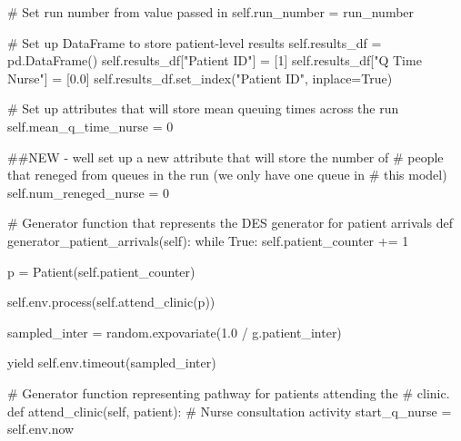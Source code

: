 \documentclass[
  letterpaper,
  DIV=11,
  numbers=noendperiod]{scrreprt}
\newenvironment{Shaded}{}{}
\newcommand{\CommentTok}[1]{\textcolor[rgb]{0.42,0.45,0.49}{#1}}
\newcommand{\ControlFlowTok}[1]{\textcolor[rgb]{0.84,0.23,0.29}{#1}}
\newcommand{\DecValTok}[1]{\textcolor[rgb]{0.00,0.36,0.77}{#1}}
\newcommand{\FloatTok}[1]{\textcolor[rgb]{0.00,0.36,0.77}{#1}}
\newcommand{\KeywordTok}[1]{\textcolor[rgb]{0.84,0.23,0.29}{#1}}
\newcommand{\NormalTok}[1]{\textcolor[rgb]{0.14,0.16,0.18}{#1}}
\newcommand{\OperatorTok}[1]{\textcolor[rgb]{0.14,0.16,0.18}{#1}}
\newcommand{\StringTok}[1]{\textcolor[rgb]{0.01,0.18,0.38}{#1}}
\newcommand{\VariableTok}[1]{\textcolor[rgb]{0.89,0.38,0.04}{#1}}
\begin{document}
\begin{tcolorbox}
\begin{Shaded}
\begin{Highlighting}[]
        \CommentTok{\# Set run number from value passed in}
        \VariableTok{self}\NormalTok{.run\_number }\OperatorTok{=}\NormalTok{ run\_number}

        \CommentTok{\# Set up DataFrame to store patient{-}level results}
        \VariableTok{self}\NormalTok{.results\_df }\OperatorTok{=}\NormalTok{ pd.DataFrame()}
        \VariableTok{self}\NormalTok{.results\_df[}\StringTok{"Patient ID"}\NormalTok{] }\OperatorTok{=}\NormalTok{ [}\DecValTok{1}\NormalTok{]}
        \VariableTok{self}\NormalTok{.results\_df[}\StringTok{"Q Time Nurse"}\NormalTok{] }\OperatorTok{=}\NormalTok{ [}\FloatTok{0.0}\NormalTok{]}
        \VariableTok{self}\NormalTok{.results\_df.set\_index(}\StringTok{"Patient ID"}\NormalTok{, inplace}\OperatorTok{=}\VariableTok{True}\NormalTok{)}

        \CommentTok{\# Set up attributes that will store mean queuing times across the run}
        \VariableTok{self}\NormalTok{.mean\_q\_time\_nurse }\OperatorTok{=} \DecValTok{0}

        \CommentTok{\#\#NEW {-} we\textquotesingle{}ll set up a new attribute that will store the number of}
        \CommentTok{\# people that reneged from queues in the run (we only have one queue in}
        \CommentTok{\# this model)}
        \VariableTok{self}\NormalTok{.num\_reneged\_nurse }\OperatorTok{=} \DecValTok{0}

    \CommentTok{\# Generator function that represents the DES generator for patient arrivals}
    \KeywordTok{def}\NormalTok{ generator\_patient\_arrivals(}\VariableTok{self}\NormalTok{):}
        \ControlFlowTok{while} \VariableTok{True}\NormalTok{:}
            \VariableTok{self}\NormalTok{.patient\_counter }\OperatorTok{+=} \DecValTok{1}

\NormalTok{            p }\OperatorTok{=}\NormalTok{ Patient(}\VariableTok{self}\NormalTok{.patient\_counter)}

            \VariableTok{self}\NormalTok{.env.process(}\VariableTok{self}\NormalTok{.attend\_clinic(p))}

\NormalTok{            sampled\_inter }\OperatorTok{=}\NormalTok{ random.expovariate(}\FloatTok{1.0} \OperatorTok{/}\NormalTok{ g.patient\_inter)}

            \ControlFlowTok{yield} \VariableTok{self}\NormalTok{.env.timeout(sampled\_inter)}


    \CommentTok{\# Generator function representing pathway for patients attending the}
    \CommentTok{\# clinic.}
    \KeywordTok{def}\NormalTok{ attend\_clinic(}\VariableTok{self}\NormalTok{, patient):}
        \CommentTok{\# Nurse consultation activity}
\NormalTok{        start\_q\_nurse }\OperatorTok{=} \VariableTok{self}\NormalTok{.env.now}


\end{Highlighting}
\end{Shaded}
\end{tcolorbox}
\end{document}
